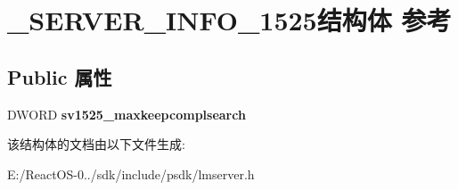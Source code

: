\hypertarget{struct___s_e_r_v_e_r___i_n_f_o__1525}{}\section{\+\_\+\+S\+E\+R\+V\+E\+R\+\_\+\+I\+N\+F\+O\+\_\+1525结构体 参考}
\label{struct___s_e_r_v_e_r___i_n_f_o__1525}
\subsection*{Public 属性}
\begin{DoxyCompactItemize}
\item 
\mbox{\label{struct___s_e_r_v_e_r___i_n_f_o__1525_a4392a1e87dcab75501d56e59693f11a4}} 
D\+W\+O\+RD {\bfseries sv1525\+\_\+maxkeepcomplsearch}
\end{DoxyCompactItemize}


该结构体的文档由以下文件生成\+:\begin{DoxyCompactItemize}
\item 
E\+:/\+React\+O\+S-\/0../sdk/include/psdk/lmserver.\+h\end{DoxyCompactItemize}

